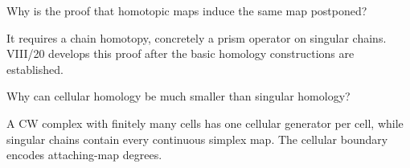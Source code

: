 \begin{problem}\label{prob:viii17-23}
Why is the proof that homotopic maps induce the same map postponed?
\end{problem}
\begin{solution}
It requires a chain homotopy, concretely a prism operator on singular chains. VIII/20 develops this proof after the basic homology constructions are established.
\end{solution}

\begin{problem}\label{prob:viii17-24}
Why can cellular homology be much smaller than singular homology?
\end{problem}
\begin{solution}
A CW complex with finitely many cells has one cellular generator per cell, while singular chains contain every continuous simplex map. The cellular boundary encodes attaching-map degrees.
\end{solution}

